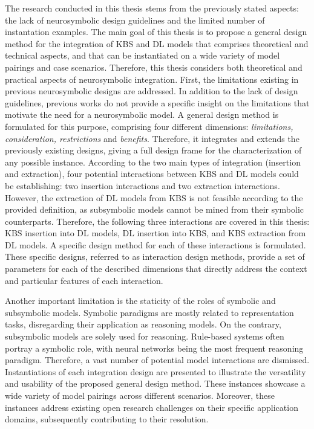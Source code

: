 The research conducted in this thesis stems from the previously stated aspects: the lack of neurosymbolic design guidelines and the limited number of instantation examples. The main goal of this thesis is to propose a general design method for the integration of KBS and DL models that comprises theoretical and technical aspects, and that can be instantiated on a wide variety of model pairings and case scenarios. Therefore, this thesis considers both theoretical and practical aspects of neurosymbolic integration. First, the limitations existing in previous neurosymbolic designs are addressed. In addition to the lack of design guidelines, previous works do not provide a specific insight on the limitations that motivate the need for a neurosymbolic model. A general design method is formulated for this purpose, comprising four different dimensions: \textit{limitations, consideration, restrictions} and \textit{benefits}. Therefore, it integrates and extends the previously existing designs, giving a full design frame for the characterization of any possible instance. According to the two main types of integration (insertion and extraction), four potential interactions between KBS and DL models could be establishing: two insertion interactions and two extraction interactions. However, the extraction of DL models from KBS is not feasible according to the provided definition, as subsymbolic models cannot be mined from their symbolic counterparts. Therefore, the following three interactions are covered in this thesis: KBS insertion into DL models, DL insertion into KBS, and KBS extraction from DL models. A specific design method for each of these interactions is formulated. These specific designs, referred to as interaction design methods, provide a set of parameters for each of the described dimensions that directly address the context and particular features of each interaction.

Another important limitation is the staticity of the roles of symbolic and subsymbolic models. Symbolic paradigms are mostly related to representation tasks, disregarding their application as reasoning models. On the contrary, subsymbolic models are solely used for reasoning. Rule-based systems often portray a symbolic role, with neural networks being the most frequent reasoning paradigm. Therefore, a vast number of potential model interactions are dismissed. Instantiations of each integration design are presented to illustrate the versatility and usability of the proposed general design method. These instances showcase a wide variety of model pairings across different scenarios. Moreover, these instances address existing open research challenges on their specific application domains, subsequently contributing to their resolution. 

